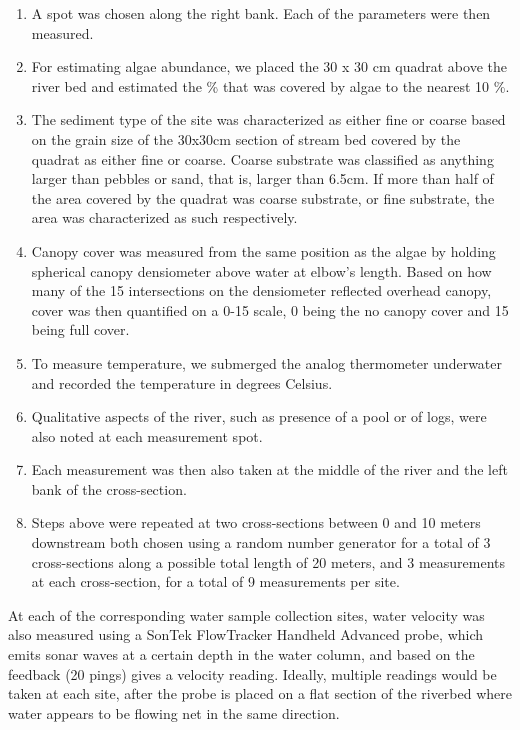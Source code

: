 \documentclass{article}\usepackage[]{graphicx}\usepackage[]{color}
\begin{document}
\begin{enumerate}
\item A spot was chosen along the right bank. Each of the parameters were then measured.
\item For estimating algae abundance, we placed the 30  x 30 cm quadrat above the river bed and estimated the \% that was covered by algae to the nearest 10 \%.

\item The sediment type of the site was characterized as either fine or coarse based on the grain size of the 30x30cm section of stream bed covered by the quadrat as either fine or coarse. Coarse substrate was classified as anything larger than pebbles or sand, that is, larger than 6.5cm. If more than half of the area covered by the quadrat was coarse substrate, or fine substrate, the area was characterized as such respectively.

\item Canopy cover was measured from the same position as the algae by holding spherical canopy densiometer above water at elbow's length. Based on how many of the 15 intersections on the densiometer reflected overhead canopy, cover was then quantified on a 0-15 scale, 0 being the no canopy cover and 15 being full cover.

\item To measure temperature, we submerged the analog thermometer underwater and recorded the temperature in degrees Celsius.

\item Qualitative aspects of the river, such as presence of a pool or of logs, were also noted at each measurement spot.

\item Each measurement was then also taken at the middle of the river and the left bank of the cross-section. 

\item Steps above were repeated at two cross-sections between 0 and 10 meters downstream both chosen using a random number generator for a total of 3 cross-sections along a possible total length of 20 meters, and 3 measurements at each cross-section, for a total of 9 measurements per site. 
\end{enumerate}

At each of the corresponding water sample collection sites, water velocity was also measured using a SonTek FlowTracker Handheld Advanced probe, which emits sonar waves at a certain depth in the water column, and based on the feedback (20 pings) gives a velocity reading. Ideally, multiple readings would be taken at each site, after the probe is placed on a flat section of the riverbed where water appears to be flowing net in the same direction. 
\end{document}

